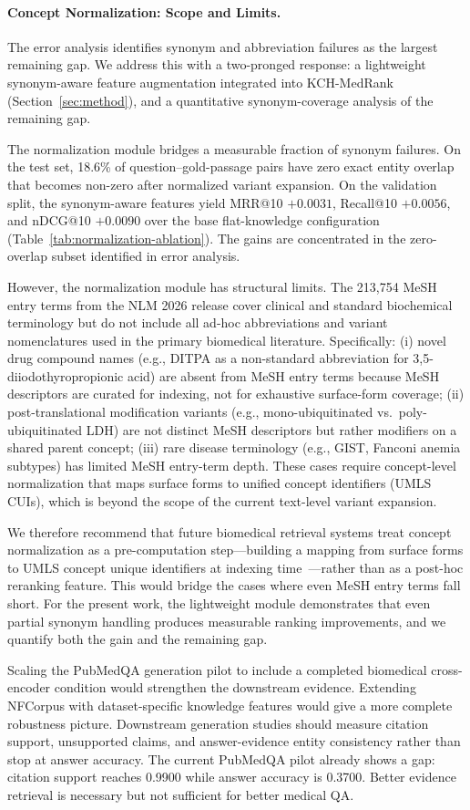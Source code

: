 \paragraph{Concept Normalization: Scope and Limits.}
The error analysis identifies synonym and abbreviation failures as the largest remaining gap. We address this with a two-pronged response: a lightweight synonym-aware feature augmentation integrated into KCH-MedRank (Section~\ref{sec:method}), and a quantitative synonym-coverage analysis of the remaining gap.

The normalization module bridges a measurable fraction of synonym failures. On the test set, 18.6\% of question--gold-passage pairs have zero exact entity overlap that becomes non-zero after normalized variant expansion. On the validation split, the synonym-aware features yield MRR@10 $+0.0031$, Recall@10 $+0.0056$, and nDCG@10 $+0.0090$ over the base flat-knowledge configuration (Table~\ref{tab:normalization-ablation}). The gains are concentrated in the zero-overlap subset identified in error analysis.

However, the normalization module has structural limits. The 213,754 MeSH entry terms from the NLM 2026 release cover clinical and standard biochemical terminology but do not include all ad-hoc abbreviations and variant nomenclatures used in the primary biomedical literature. Specifically: (i) novel drug compound names (e.g., DITPA as a non-standard abbreviation for 3,5-diiodothyropropionic acid) are absent from MeSH entry terms because MeSH descriptors are curated for indexing, not for exhaustive surface-form coverage; (ii) post-translational modification variants (e.g., mono-ubiquitinated vs.\ poly-ubiquitinated LDH) are not distinct MeSH descriptors but rather modifiers on a shared parent concept; (iii) rare disease terminology (e.g., GIST, Fanconi anemia subtypes) has limited MeSH entry-term depth. These cases require concept-level normalization that maps surface forms to unified concept identifiers (UMLS CUIs), which is beyond the scope of the current text-level variant expansion.

We therefore recommend that future biomedical retrieval systems treat concept normalization as a pre-computation step---building a mapping from surface forms to UMLS concept unique identifiers at indexing time~\citep{bodenreider2004umls,leaman2013dnorm}---rather than as a post-hoc reranking feature. This would bridge the cases where even MeSH entry terms fall short. For the present work, the lightweight module demonstrates that even partial synonym handling produces measurable ranking improvements, and we quantify both the gain and the remaining gap.

Scaling the PubMedQA generation pilot to include a completed biomedical cross-encoder condition would strengthen the downstream evidence. Extending NFCorpus with dataset-specific knowledge features would give a more complete robustness picture. Downstream generation studies should measure citation support, unsupported claims, and answer-evidence entity consistency rather than stop at answer accuracy. The current PubMedQA pilot already shows a gap: citation support reaches 0.9900 while answer accuracy is 0.3700. Better evidence retrieval is necessary but not sufficient for better medical QA.
